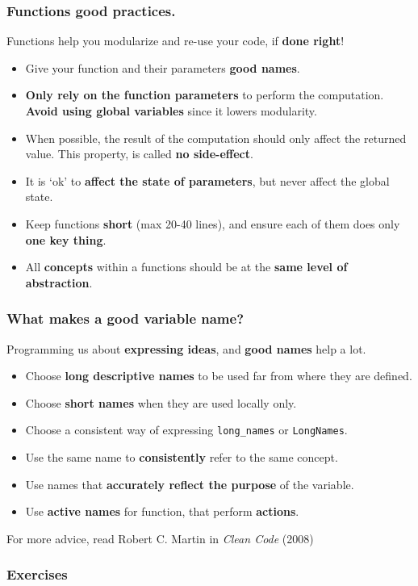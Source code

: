\documentclass{beamer} %
\newcommand\emc[1]{\textcolor{brightblue}{\textbf{#1}}}
\begin{document}
\begin{frame}
\frametitle{Functions good practices.}

Functions help you modularize and re-use your code, if \emc{done right}!
\begin{itemize}
	\item Give your function and their parameters \emc{good names}.
	\item \emc{Only rely on the function parameters} to perform the computation. \emc{Avoid using global variables} since it lowers modularity.
	\item When possible, the result of the computation should only affect the returned value. This property, is called \emc{no side-effect}.
	\item It is `ok' to \emc{affect the state of parameters}, but never affect the global state.
	\item Keep functions \emc{short} (max 20-40 lines), and ensure each of them does only \emc{one key thing}. 
	\item All \emc{concepts} within a functions should be at the \emc{same level of abstraction}.
\end{itemize}

\end{frame}

\begin{frame}
\frametitle{What makes a good variable name?}

Programming us about \emc{expressing ideas}, and \emc{good names} help a lot.

\begin{itemize}
	\item Choose \emc{long descriptive names} to be used far from where they are defined.
	\item Choose \emc{short names} when they are used locally only.
	\item Choose a consistent way of expressing \texttt{long\_names} or \texttt{LongNames}.
	\item Use the same name to \emc{consistently} refer to the same concept.
	\item Use names that \emc{accurately reflect the purpose} of the variable.
	\item Use \emc{active names} for function, that perform \emc{actions}.
\end{itemize}

For more advice, read Robert C. Martin in \emph{Clean Code} (2008)

\end{frame}


\begin{frame}
\frametitle{Exercises}

\end{frame}




\end{document}
